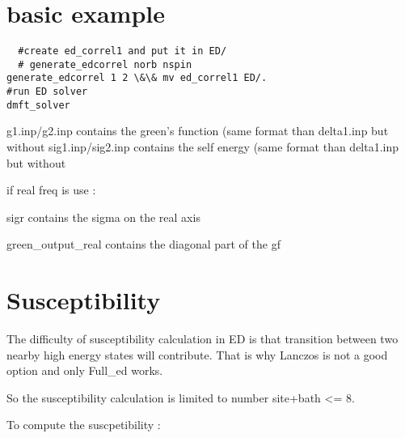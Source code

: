 \documentclass{book}
\begin{document}
\section{basic example}

\begin{lstlisting}
  #create ed_correl1 and put it in ED/
  # generate_edcorrel norb nspin
generate_edcorrel 1 2 \&\& mv ed_correl1 ED/.
#run ED solver
dmft_solver
  \end{lstlisting}
  g1.inp/g2.inp contains the green's function (same format than delta1.inp but without
  sig1.inp/sig2.inp contains the self energy (same format than delta1.inp but without

  if real freq is use :

  sigr contains the sigma on the real axis

   green\_output\_real  contains the diagonal part of the gf

\section{Susceptibility}


The difficulty of susceptibility calculation in ED is that transition between two nearby high energy states  will contribute. That is why Lanczos is not a good option and only Full\_ed works.

So the susceptibility calculation is limited to number site+bath <= 8.

To compute the suscpetibility :
\end{document}
